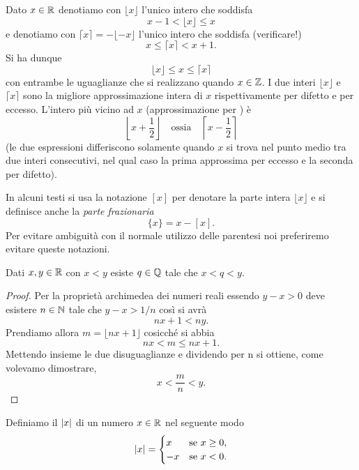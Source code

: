 \begin{definition}
\mymark{**}
Dato $x\in \mathbb R$ denotiamo con $\lfloor x\rfloor$ l'unico intero
che soddisfa
\mynote{$\lfloor\cdot\rfloor$} %
\[
  x - 1 < \lfloor x \rfloor \le x
\]
e denotiamo con $\lceil x \rceil = - \lfloor -x \rfloor$ l'unico intero che soddisfa (verificare!)
\mynote{$\lceil\cdot\rceil$} %
\[
  x \le \lceil x \rceil < x + 1.
\]
Si ha dunque
\[
  \lfloor x \rfloor \le x \le \lceil x \rceil
\]
con entrambe le uguaglianze che si realizzano quando $x\in \mathbb Z$.
I due interi $\lfloor x \rfloor$ e $\lceil x \rceil$
sono la migliore approssimazione intera di $x$ rispettivamente
per difetto e per eccesso.
L'intero più vicino ad $x$ (approssimazione per )
è
\[
  \left\lfloor x + \frac 1 2 \right\rfloor
\quad \text{ossia} \quad
  \left\lceil x-\frac 1 2 \right\rceil
\]
(le due espressioni differiscono solamente quando $x$ si trova nel punto medio tra due interi consecutivi, nel qual caso la prima approssima per eccesso e la seconda per difetto).
\end{definition}
In alcuni testi si usa la notazione $[x]$ per denotare la parte intera $\lfloor x \rfloor$ e si definisce
anche la \emph{parte frazionaria}
\[
   \{x\} = x - [x].
\]
Per evitare ambiguità con il normale utilizzo delle parentesi
noi preferiremo evitare queste notazioni.

\begin{theorem}[densità di $\QQ$ in $\RR$]
\mymark{*}
Dati $x,y \in \mathbb R$ con $x<y$ esiste $q\in \mathbb Q$ tale che $x<q<y$.
\end{theorem}
%
\begin{proof}
Per la proprietà archimedea dei numeri reali essendo $y-x>0$
deve esistere $n\in \mathbb N$ tale che $y-x > 1/n$ così si avrà
\[
    nx + 1 < ny.
\]
Prendiamo allora $m=\lfloor nx + 1\rfloor$ cosicché si abbia
\[
  nx < m \le nx + 1.
\]
Mettendo insieme le due disuguaglianze e dividendo per n si ottiene,
come volevamo dimostrare,
\[
 x < \frac{m}{n} < y.
\]
\end{proof}


\begin{definition}
\mymark{***}
Definiamo il  ${\left|x\right|}$ di un numero $x\in \mathbb R$ nel seguente modo
\[
{\left|x\right|} =
\begin{cases}
  x & \text{se $x\ge 0$}, \\
  -x & \text{se $x<0 $}.
\end{cases}
\]
\end{definition}

